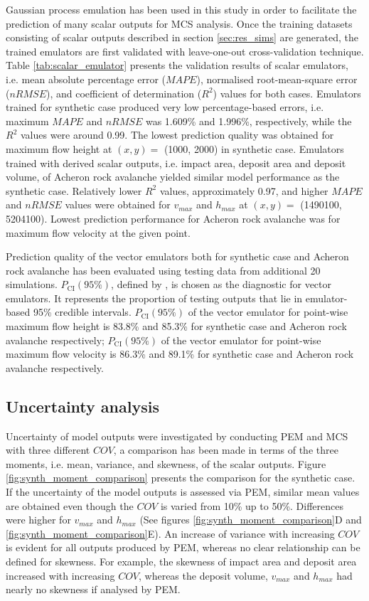 \documentclass[utf8]{FrontiersinHarvard}
\begin{document}
Gaussian process emulation has been used in this study in order to facilitate the prediction of many scalar outputs for MCS analysis. Once the training datasets consisting of scalar outputs described in section \ref{sec:res_sims} are generated, the trained emulators are first validated with leave-one-out cross-validation technique. Table \ref{tab:scalar_emulator} presents the validation results of scalar emulators, i.e. mean absolute percentage error ($MAPE$), normalised root-mean-square error ($nRMSE$), and coefficient of determination ($R^2$) values for both cases. Emulators trained for synthetic case produced very low percentage-based errors, i.e. maximum $MAPE$ and $nRMSE$ was 1.609\% and 1.996\%, respectively, while the $R^2$ values were around 0.99. The lowest prediction quality was obtained for maximum flow height at $\left( x, y \right) = $ (1000, 2000) in synthetic case. Emulators trained with derived scalar outputs, i.e. impact area, deposit area and deposit volume, of Acheron rock avalanche yielded similar model performance as the synthetic case. Relatively lower $R^2$ values, approximately 0.97, and higher $MAPE$ and $nRMSE$ values were obtained for $v_{max}$ and $h_{max}$ at $\left( x, y \right) = $ (1490100, 5204100). Lowest prediction performance for Acheron rock avalanche was for maximum flow velocity at the given point.

Prediction quality of the vector emulators both for synthetic case and Acheron rock avalanche has been evaluated using testing data from additional 20 simulations. $P_\text{CI}(95\%)$, defined by \citet{Gu2016}, is chosen as the diagnostic for vector emulators. It represents the proportion of testing outputs that lie in emulator-based 95\% credible intervals. $P_\text{CI}(95\%)$ of the vector emulator for point-wise maximum flow height is 83.8\% and 85.3\% for synthetic case and Acheron rock avalanche respectively; $P_\text{CI}(95\%)$ of the vector emulator for point-wise maximum flow velocity is 86.3\% and 89.1\% for synthetic case and Acheron rock avalanche respectively.

\subsection{Uncertainty analysis}
\label{sec:res_uncertain}

Uncertainty of model outputs were investigated by conducting PEM and MCS with three different $COV$, a comparison has been made in terms of the three moments, i.e. mean, variance, and skewness, of the scalar outputs. Figure \ref{fig:synth_moment_comparison} presents the comparison for the synthetic case. If the uncertainty of the model outputs is assessed via PEM, similar mean values are obtained even though the $COV$ is varied from 10\% up to 50\%. Differences were higher for $v_{max}$ and $h_{max}$ (See figures \ref{fig:synth_moment_comparison}D and \ref{fig:synth_moment_comparison}E). An increase of variance with increasing $COV$ is evident for all outputs produced by PEM, whereas no clear relationship can be defined for skewness. For example, the skewness of impact area and deposit area increased with increasing $COV$, whereas the deposit volume, $v_{max}$ and $h_{max}$ had nearly no skewness if analysed by PEM.
\end{document}
